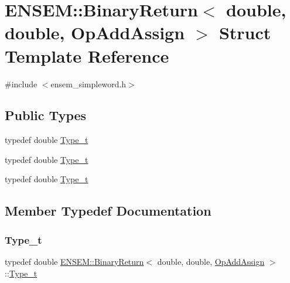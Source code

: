 \hypertarget{structENSEM_1_1BinaryReturn_3_01double_00_01double_00_01OpAddAssign_01_4}{}\section{E\+N\+S\+EM\+:\+:Binary\+Return$<$ double, double, Op\+Add\+Assign $>$ Struct Template Reference}
\label{structENSEM_1_1BinaryReturn_3_01double_00_01double_00_01OpAddAssign_01_4}


{\ttfamily \#include $<$ensem\+\_\+simpleword.\+h$>$}

\subsection*{Public Types}
\begin{DoxyCompactItemize}
\item 
typedef double \mbox{\hyperlink{structENSEM_1_1BinaryReturn_3_01double_00_01double_00_01OpAddAssign_01_4_a9b6757965dc033c66ff45da5c69ea6cc}{Type\+\_\+t}}
\item 
typedef double \mbox{\hyperlink{structENSEM_1_1BinaryReturn_3_01double_00_01double_00_01OpAddAssign_01_4_a9b6757965dc033c66ff45da5c69ea6cc}{Type\+\_\+t}}
\item 
typedef double \mbox{\hyperlink{structENSEM_1_1BinaryReturn_3_01double_00_01double_00_01OpAddAssign_01_4_a9b6757965dc033c66ff45da5c69ea6cc}{Type\+\_\+t}}
\end{DoxyCompactItemize}


\subsection{Member Typedef Documentation}
\mbox{\label{structENSEM_1_1BinaryReturn_3_01double_00_01double_00_01OpAddAssign_01_4_a9b6757965dc033c66ff45da5c69ea6cc}} 
\subsubsection{\texorpdfstring{Type\_t}{Type\_t}\hspace{0.1cm}{\footnotesize\ttfamily [1/3]}}
{\footnotesize\ttfamily typedef double \mbox{\hyperlink{structENSEM_1_1BinaryReturn}{E\+N\+S\+E\+M\+::\+Binary\+Return}}$<$ double, double, \mbox{\hyperlink{structENSEM_1_1OpAddAssign}{Op\+Add\+Assign}} $>$\+::\mbox{\hyperlink{structENSEM_1_1BinaryReturn_3_01double_00_01double_00_01OpAddAssign_01_4_a9b6757965dc033c66ff45da5c69ea6cc}{Type\+\_\+t}}}

